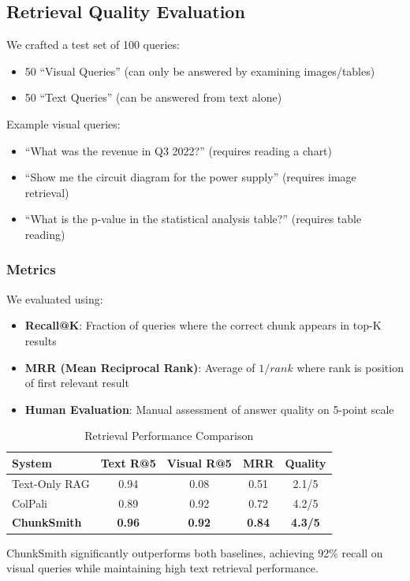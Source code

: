 \documentclass[conference]{IEEEtran}
\begin{document}
\subsection{Retrieval Quality Evaluation}
We crafted a test set of 100 queries:
\begin{itemize}
    \item 50 ``Visual Queries'' (can only be answered by examining images/tables)
    \item 50 ``Text Queries'' (can be answered from text alone)
\end{itemize}
Example visual queries:
\begin{itemize}
    \item ``What was the revenue in Q3 2022?'' (requires reading a chart)
    \item ``Show me the circuit diagram for the power supply'' (requires image retrieval)
    \item ``What is the p-value in the statistical analysis table?'' (requires table reading)
\end{itemize}

\subsubsection{Metrics}
We evaluated using:
\begin{itemize}
    \item \textbf{Recall@K}: Fraction of queries where the correct chunk appears in top-K results
    \item \textbf{MRR (Mean Reciprocal Rank)}: Average of $1/rank$ where rank is position of first relevant result
    \item \textbf{Human Evaluation}: Manual assessment of answer quality on 5-point scale
\end{itemize}

\begin{table}[h]
\centering
\caption{Retrieval Performance Comparison}
\begin{tabular}{@{}lcccc@{}}
\toprule
\textbf{System} & \textbf{Text R@5} & \textbf{Visual R@5} & \textbf{MRR} & \textbf{Quality} \\ \midrule
Text-Only RAG   & 0.94 & 0.08 & 0.51 & 2.1/5 \\
ColPali         & 0.89 & 0.92 & 0.72 & 4.2/5 \\
\textbf{ChunkSmith} & \textbf{0.96} & \textbf{0.92} & \textbf{0.84} & \textbf{4.3/5} \\ \bottomrule
\end{tabular}
\label{tab:retrieval}
\end{table}
ChunkSmith significantly outperforms both baselines, achieving 92\% recall on visual queries while maintaining high text retrieval performance.
\end{document}
